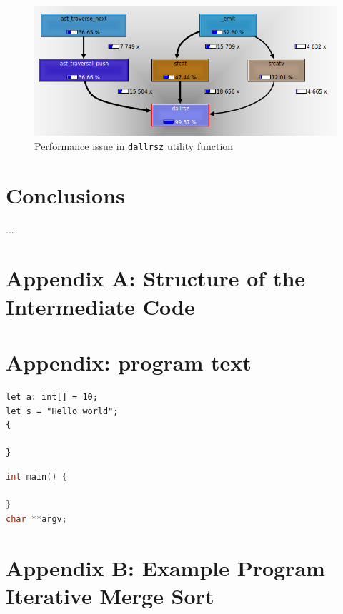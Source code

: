\documentclass[a4paper]{article}
\begin{document}
\begin{figure}[H]
    \centering
    \includegraphics[scale=0.85]{imgs/dallrsz_callgraph.png}
    \caption{Performance issue in \texttt{dallrsz} utility function}
\end{figure}


\section{Conclusions}

...


\clearpage
\section{Appendix A: Structure of the Intermediate Code}
\label{appendix_a}

\section{Appendix: program text}




\begin{lstlisting}[language=DPL]
let a: int[] = 10;
let s = "Hello world";
{

}
\end{lstlisting}

\begin{lstlisting}[language=C]
int main() {

}
char **argv;
\end{lstlisting}


\clearpage
\section{Appendix B: Example Program Iterative Merge Sort}
\label{appendix_b}
\end{document}
